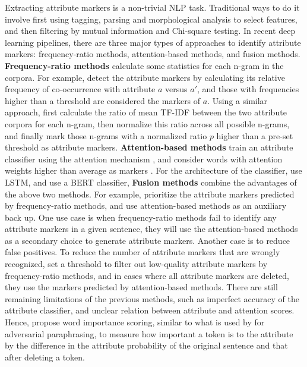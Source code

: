 \label{sec:attr_marker_detect}
Extracting attribute markers is a non-trivial NLP task. Traditional ways to do it involve first using tagging, parsing and morphological analysis to select features, and then filtering by mutual information and Chi-square testing. In recent deep learning pipelines,
there are three major types of approaches to identify attribute markers: frequency-ratio methods, attention-based methods, and fusion methods.
{\bf Frequency-ratio methods} calculate some statistics for each n-gram in the corpora.
For example,  detect the attribute markers by calculating its relative frequency of co-occurrence with attribute $a$ versus ${a}'$, and those with frequencies higher than a threshold are considered the markers of $a$. Using a similar approach,  first calculate the ratio of mean TF-IDF between the two attribute corpora for each n-gram, then normalize this ratio across all possible n-grams, and finally mark those n-grams with a normalized ratio $p$ higher than a pre-set threshold as attribute markers.
{\bf Attention-based methods} train an attribute classifier using the attention mechanism , and consider words with attention weights higher than average as markers .
For the architecture of the classifier,  use LSTM, and  use a BERT classifier, 
{\bf Fusion methods} combine the advantages of the above two methods. For example,  prioritize the attribute markers predicted by frequency-ratio methods, and use attention-based methods as an auxiliary back up. One use case is when
frequency-ratio methods fail to identify any attribute markers in a given sentence, they will use the attention-based methods as a secondary choice to generate attribute markers.
Another case is to reduce false positives. To reduce the number of attribute markers that are wrongly recognized,  set a threshold to filter out
low-quality attribute markers by frequency-ratio methods, and in cases where all attribute markers are deleted, they use the markers predicted by attention-based methods.
There are still remaining limitations of the previous methods, such as
imperfect accuracy of the attribute classifier, and unclear relation between attribute and attention scores. Hence,  propose word importance scoring, similar to what is used by  for adversarial paraphrasing, to measure how important a token is to the attribute by the difference in the attribute probability of the original sentence and that after deleting a token.

